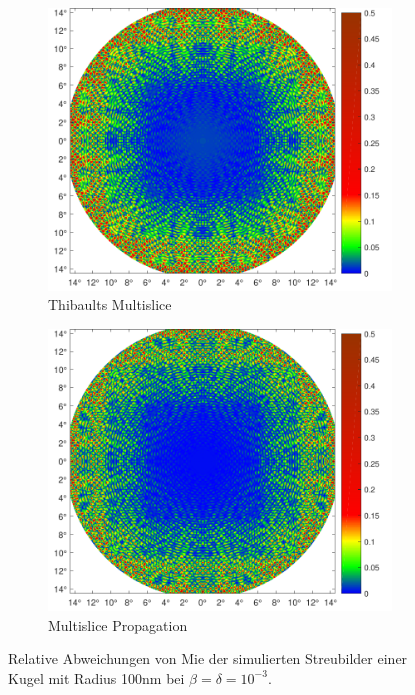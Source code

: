 \begin{figure}
	\begin{subfigure}[b]{0.49\textwidth}
		\includegraphics[width=\textwidth]{images/fig_sim_relerror_thibault-r100-bd1e-3.pdf}
		\caption{Thibaults Multislice}
	\end{subfigure}
	\begin{subfigure}[b]{0.49\textwidth}
		\includegraphics[width=\textwidth]{images/fig_sim_relerror_multislice-r100-bd1e-3.pdf}
		\caption{Multislice Propagation}
	\end{subfigure}
	
	\caption[relativer Fehler der Simulationen]{Relative Abweichungen von Mie der simulierten Streubilder einer Kugel mit Radius 100\si{nm} bei $\beta=\delta=10^{-3}$. }
	\label{fig:var}
\end{figure}

